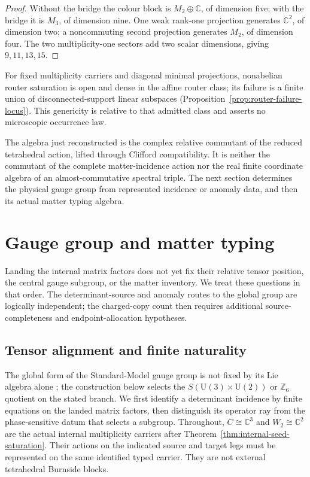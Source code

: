 \documentclass[11pt]{article}
\numberwithin{equation}{section}
\theoremstyle{definition}
\theoremstyle{remark}
\newcommand{\Z}{\mathbb Z}
\newcommand{\C}{\mathbb C}
\newcommand{\U}{\mathrm U}
\begin{document}
\begin{proof}
Without the bridge the colour block is $M_2\oplus\C$, of dimension five; with
the bridge it is $M_3$, of dimension nine.  One weak rank-one projection
generates $\C^2$, of dimension two; a noncommuting second projection generates
$M_2$, of dimension four.  The two multiplicity-one sectors add two scalar
dimensions, giving $9,11,13,15$.
\end{proof}

For fixed multiplicity carriers and diagonal minimal projections,
nonabelian router saturation is open and dense in the affine router class;
its failure is a finite union of disconnected-support linear subspaces
(Proposition~\ref{prop:router-failure-locus}).  This genericity is relative to
that admitted class and asserts no microscopic occurrence law.

The algebra just reconstructed is the complex relative commutant of the
reduced tetrahedral action, lifted through Clifford compatibility.  It is
neither the commutant of the complete matter-incidence action nor the real
finite coordinate algebra of an almost-commutative spectral triple.
The next section determines the physical gauge group from represented
incidence or anomaly data, and then its actual matter typing algebra.


\section{Gauge group and matter typing}
\label{sec:gauge-matter}

Landing the internal matrix factors does not yet fix their relative tensor
position, the central gauge subgroup, or the matter inventory.  We treat
these questions in that order.  The determinant-source and anomaly routes
to the global group are logically independent; the charged-copy count then
requires additional source-completeness and endpoint-allocation hypotheses.


\subsection{Tensor alignment and finite naturality}
\label{sec:determinant-naturality}

The global form of the Standard-Model gauge group is not fixed by its Lie
algebra alone \cite{Hucks1991,Tong2017}; the construction below selects the
$S(\U(3)\times\U(2))$ or $\Z_6$ quotient on the stated branch.  We first identify a determinant
incidence by finite equations on the landed matrix factors, then distinguish
its operator ray from the phase-sensitive datum that selects a subgroup.
Throughout, $C\cong\C^3$ and $W_2\cong\C^2$ are the actual internal
multiplicity carriers after Theorem~\ref{thm:internal-seed-saturation}.
Their actions on the indicated source and target legs must be represented on
the same identified typed carrier.  They are not external tetrahedral
Burnside blocks.
\end{document}
